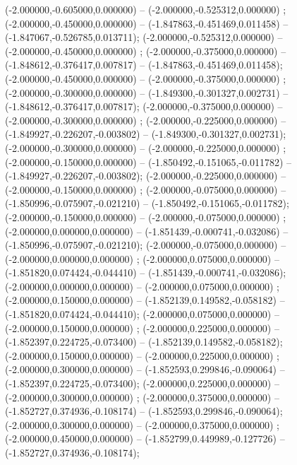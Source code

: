  (-2.000000,-0.605000,0.000000) -- (-2.000000,-0.525312,0.000000) ;
 (-2.000000,-0.450000,0.000000) -- (-1.847863,-0.451469,0.011458) -- (-1.847067,-0.526785,0.013711);
 (-2.000000,-0.525312,0.000000) -- (-2.000000,-0.450000,0.000000) ;
 (-2.000000,-0.375000,0.000000) -- (-1.848612,-0.376417,0.007817) -- (-1.847863,-0.451469,0.011458);
 (-2.000000,-0.450000,0.000000) -- (-2.000000,-0.375000,0.000000) ;
 (-2.000000,-0.300000,0.000000) -- (-1.849300,-0.301327,0.002731) -- (-1.848612,-0.376417,0.007817);
 (-2.000000,-0.375000,0.000000) -- (-2.000000,-0.300000,0.000000) ;
 (-2.000000,-0.225000,0.000000) -- (-1.849927,-0.226207,-0.003802) -- (-1.849300,-0.301327,0.002731);
 (-2.000000,-0.300000,0.000000) -- (-2.000000,-0.225000,0.000000) ;
 (-2.000000,-0.150000,0.000000) -- (-1.850492,-0.151065,-0.011782) -- (-1.849927,-0.226207,-0.003802);
 (-2.000000,-0.225000,0.000000) -- (-2.000000,-0.150000,0.000000) ;
 (-2.000000,-0.075000,0.000000) -- (-1.850996,-0.075907,-0.021210) -- (-1.850492,-0.151065,-0.011782);
 (-2.000000,-0.150000,0.000000) -- (-2.000000,-0.075000,0.000000) ;
 (-2.000000,0.000000,0.000000) -- (-1.851439,-0.000741,-0.032086) -- (-1.850996,-0.075907,-0.021210);
 (-2.000000,-0.075000,0.000000) -- (-2.000000,0.000000,0.000000) ;
 (-2.000000,0.075000,0.000000) -- (-1.851820,0.074424,-0.044410) -- (-1.851439,-0.000741,-0.032086);
 (-2.000000,0.000000,0.000000) -- (-2.000000,0.075000,0.000000) ;
 (-2.000000,0.150000,0.000000) -- (-1.852139,0.149582,-0.058182) -- (-1.851820,0.074424,-0.044410);
 (-2.000000,0.075000,0.000000) -- (-2.000000,0.150000,0.000000) ;
 (-2.000000,0.225000,0.000000) -- (-1.852397,0.224725,-0.073400) -- (-1.852139,0.149582,-0.058182);
 (-2.000000,0.150000,0.000000) -- (-2.000000,0.225000,0.000000) ;
 (-2.000000,0.300000,0.000000) -- (-1.852593,0.299846,-0.090064) -- (-1.852397,0.224725,-0.073400);
 (-2.000000,0.225000,0.000000) -- (-2.000000,0.300000,0.000000) ;
 (-2.000000,0.375000,0.000000) -- (-1.852727,0.374936,-0.108174) -- (-1.852593,0.299846,-0.090064);
 (-2.000000,0.300000,0.000000) -- (-2.000000,0.375000,0.000000) ;
 (-2.000000,0.450000,0.000000) -- (-1.852799,0.449989,-0.127726) -- (-1.852727,0.374936,-0.108174);
